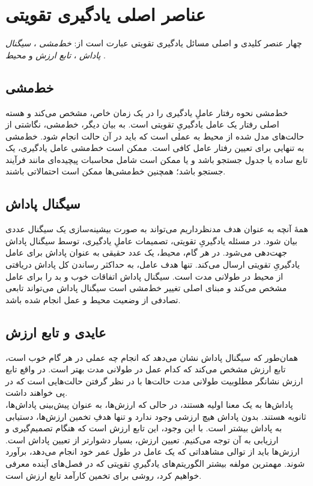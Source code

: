 \section{عناصر اصلی یادگیری تقویتی}
چهار عنصر کلیدی و اصلی مسائل یادگیری تقویتی عبارت است از:
\textit{خط‌مشی} ، 
\textit{سیگنال پاداش} ،
\textit{تابع ارزش}  
و
\textit{محیط} .
\subsection{خط‌مشی}
خط‌مشی نحوه رفتار عاملِ یادگیری را در یک زمان خاص، مشخص می‌کند و هسته اصلی رفتار یک عامل یادگیریِ تقویتی است. به بیان دیگر، خط‌مشی، نگاشتی از حالت‌های مدل شده از محیط به عملی است که باید در آن حالت انجام شود. خط‌مشی به تنهایی برای تعیین رفتار عامل کافی است. ممکن است
خط‌مشی عامل یادگیری، یک تابع ساده یا جدول جستجو باشد و یا ممکن است شامل محاسبات پیچیده‌ای مانند فرآیند جستجو باشد؛ همچنین
خط‌مشی‌ها ممکن است احتمالاتی باشند.


\subsection{سیگنال پاداش}

همهٔ آنچه به عنوان هدف مدنظرداریم می‌تواند به صورت بیشینه‌سازی  یک سیگنال عددی بیان شود. در مسئله یادگیریِ تقویتی، تصمیمات عاملِ یادگیری، توسط سیگنال پاداش جهت‌دهی می‌شود. در هر گام، محیط، یک عدد حقیقی به عنوان پاداش برای عامل یادگیریِ تقویتی ارسال می‌کند. تنها هدف عامل، به حداکثر رساندن کل پاداش دریافتی از محیط در طولانی مدت است. سیگنال پاداش اتفاقات خوب و بد را برای عامل مشخص می‌کند و مبنای اصلی تغییر خط‌مشی است
سیگنال پاداش می‌تواند تابعی تصادفی از وضعیت محیط و عمل انجام شده باشد.


\subsection{عایدی و تابع ارزش}
همان‌طور که سیگنال پاداش نشان می‌دهد که انجام چه عملی در هر گام خوب است، تابع ارزش مشخص می‌کند که کدام عمل در طولانی مدت بهتر است. در واقع تابع ارزش نشانگر مطلوبیت طولانی مدت حالت‌ها با در نظر گرفتن حالت‌هایی است که در پی خواهند داشت.
\\پاداش‌ها به یک معنا اولیه هستند، در حالی که ارزش‌ها، به عنوان پیش‌بینی پاداش‌ها، ثانویه هستند. بدون پاداش هیچ ارزشی وجود ندارد و تنها هدفِ تخمین ارزش‌ها، دستیابی به پاداش بیشتر است. با این وجود، این تابع ارزش است که هنگام تصمیم‌گیری و ارزیابی به آن توجه می‌کنیم.
تعیین ارزش،‌ بسیار دشوارتر از تعیین پاداش است.
ارزش‌ها باید از توالی مشاهداتی که یک عامل در طول عمر خود انجام می‌دهد، برآورد شوند.
مهمترین مولفه بیشتر الگوریتم‌های یادگیریِ تقویتی که در  فصل‌های آینده معرفی خواهیم کرد، روشی برای تخمین کارآمد تابع ارزش است.

